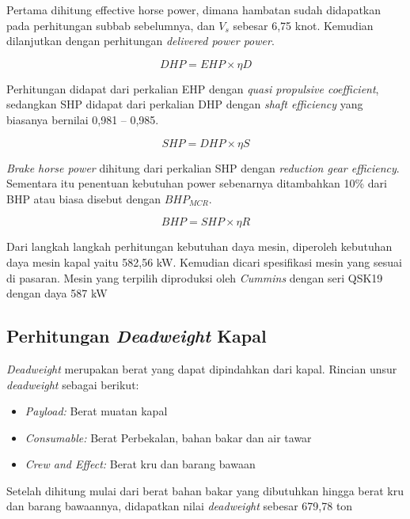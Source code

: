 Pertama dihitung effective horse power, dimana hambatan sudah didapatkan pada perhitungan subbab sebelumnya, dan $V_s$ sebesar 6,75 knot. Kemudian dilanjutkan dengan perhitungan \emph{delivered power power}.

\begin{equation}
    DHP = EHP \times \eta D
\end{equation}

Perhitungan didapat dari perkalian EHP dengan \emph{quasi propulsive coefficient}, sedangkan SHP didapat dari perkalian DHP dengan \emph{shaft efficiency} yang biasanya bernilai 0,981 – 0,985.

\begin{equation}
    SHP = DHP \times \eta S
\end{equation}

\emph{Brake horse power} dihitung dari perkalian SHP dengan \emph{reduction gear efficiency}. Sementara
itu penentuan kebutuhan power sebenarnya ditambahkan 10\% dari BHP atau biasa disebut
dengan $BHP_{MCR}$.

\begin{equation}
    BHP = SHP \times \eta R
\end{equation}

Dari langkah langkah perhitungan kebutuhan daya mesin, diperoleh kebutuhan daya mesin kapal yaitu 582,56 kW. Kemudian dicari spesifikasi mesin yang sesuai di pasaran. Mesin yang terpilih diproduksi oleh \emph{Cummins} dengan seri QSK19 dengan daya 587 kW

\subsection{Perhitungan \emph{Deadweight} Kapal}
\label{subsec:perhitungan-dwt}

\emph{Deadweight} merupakan berat yang dapat dipindahkan dari kapal. Rincian unsur \emph{deadweight} sebagai berikut:
\begin{itemize}
    \item \emph{Payload:} Berat muatan kapal
    \item \emph{Consumable:}  Berat Perbekalan, bahan bakar dan air tawar
    \item \emph{Crew and Effect:} Berat kru dan barang bawaan
\end{itemize}

Setelah dihitung mulai dari berat bahan bakar yang dibutuhkan hingga berat kru dan barang bawaannya, didapatkan nilai \emph{deadweight} sebesar 679,78 ton


